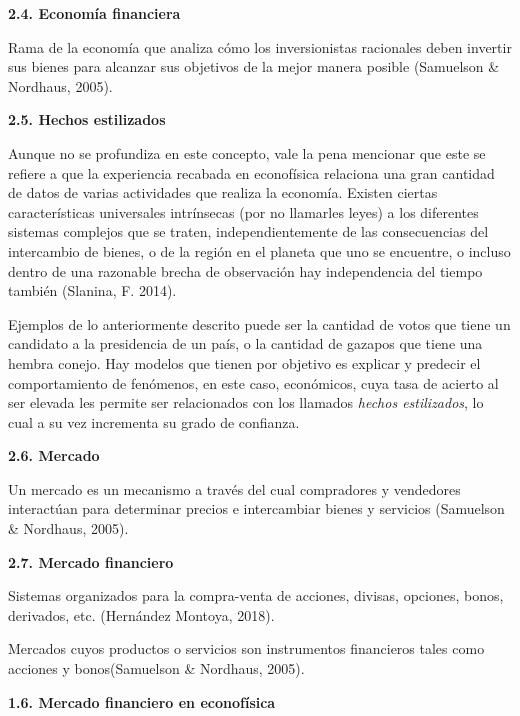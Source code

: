 {
\noindent
\Large  \textbf{2.4. Economía financiera} 
}

Rama de la economía que analiza cómo los inversionistas racionales deben invertir sus bienes para alcanzar sus objetivos de la mejor manera posible  (Samuelson \& Nordhaus, 2005).
\newline

{
\noindent
\Large  \textbf{2.5. Hechos estilizados} 
}

Aunque no se profundiza en este concepto, vale la pena mencionar que este  se refiere a que la experiencia recabada en econofísica relaciona una gran cantidad de datos de varias actividades que realiza la economía. Existen ciertas características universales intrínsecas (por no llamarles leyes) a los diferentes sistemas complejos que se traten, independientemente de las consecuencias del intercambio de bienes, o de la región en el planeta que uno se encuentre, o incluso dentro de una razonable brecha de observación hay independencia del tiempo también (Slanina, F. 2014). 
\newline

Ejemplos de lo anteriormente descrito puede ser la cantidad de votos que tiene un candidato a la presidencia de un país, o la cantidad de gazapos que tiene una hembra conejo. Hay modelos que tienen por objetivo es explicar y predecir el comportamiento de fenómenos, en este caso, económicos, cuya tasa de acierto al ser elevada les permite ser relacionados con los llamados \textit{hechos estilizados}, lo cual a su vez incrementa su grado de confianza.    
\newline


{
\noindent
\Large  \textbf{2.6. Mercado} 
}

Un mercado es un mecanismo a través del cual compradores y vendedores interactúan para determinar precios e intercambiar bienes y servicios (Samuelson \& Nordhaus, 2005).
\newpage


{
\noindent
\Large  \textbf{2.7. Mercado financiero} 
}

Sistemas organizados para la compra-venta de acciones, divisas, opciones, bonos, derivados, etc. (Hernández Montoya, 2018).
\newline

Mercados cuyos productos o servicios son instrumentos financieros tales como acciones y bonos(Samuelson \& Nordhaus, 2005). 
\newline

{
\noindent
\Large  \textbf{1.6. Mercado financiero en econofísica} 
}

